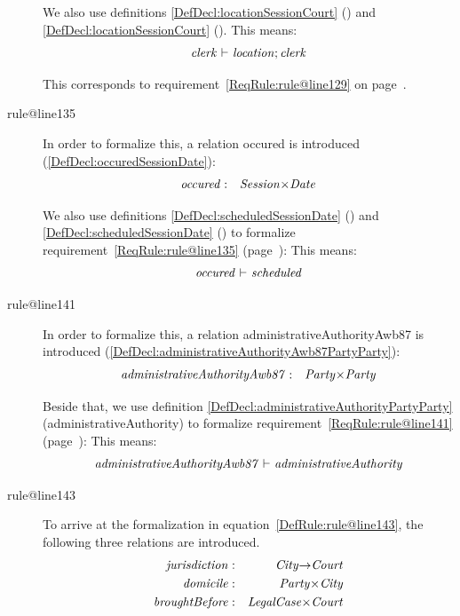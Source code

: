 \documentclass[10pt,a4paper]{report}              %
\theoremstyle{plain}\theorembodyfont{\rmfamily}\newtheorem{definition}{Definition}[section]
\theoremstyle{plain}\theorembodyfont{\rmfamily}\newtheorem{designrule}[definition]{Requirement}
\def\id#1{\mbox{\em #1\/}}
\begin{document}
\begin{description}
We also use definitions \ref{DefDecl:locationSessionCourt} ({}) and \ref{DefDecl:locationSessionCourt} ({}). 
This means: 
\begin{equation}
   {\id{clerk}}\ {\vdash}\ {\id{location}};{\id{clerk}}\label{DefRule:rule@line129}
\end{equation}

This corresponds to requirement~\ref{ReqRule:rule@line129} on page~\pageref{ReqRule:rule@line129}.
\item[rule@line135]
In order to formalize this, a relation
occured is introduced (\ref{DefDecl:occuredSessionDate}):
\begin{eqnarray}
   {\id{occured}}&:&{\id{Session}}{\times}{\id{Date}}\label{DefDecl:occuredSessionDate}
\end{eqnarray}

We also use definitions \ref{DefDecl:scheduledSessionDate} ({}) and \ref{DefDecl:scheduledSessionDate} ({}) to formalize requirement~\ref{ReqRule:rule@line135} (page~\pageref{ReqRule:rule@line135}):
This means: 
\begin{equation}
   {\id{occured}}\ {\vdash}\ {\id{scheduled}}\label{DefRule:rule@line135}
\end{equation}

\item[rule@line141]
In order to formalize this, a relation
administrativeAuthorityAwb87 is introduced (\ref{DefDecl:administrativeAuthorityAwb87PartyParty}):
\begin{eqnarray}
   {\id{administrativeAuthorityAwb87}}&:&{\id{Party}}{\times}{\id{Party}}\label{DefDecl:administrativeAuthorityAwb87PartyParty}
\end{eqnarray}

Beside that, we use definition \ref{DefDecl:administrativeAuthorityPartyParty}
(administrativeAuthority) to formalize requirement~\ref{ReqRule:rule@line141} (page~\pageref{ReqRule:rule@line141}):
This means: 
\begin{equation}
   {\id{administrativeAuthorityAwb87}}\ {\vdash}\ {\id{administrativeAuthority}}\label{DefRule:rule@line141}
\end{equation}

\item[rule@line143]
To arrive at the formalization in equation~\ref{DefRule:rule@line143}, the following three relations are introduced.
\begin{eqnarray}
   {\id{jurisdiction}}&:&{\id{City}}{\rightarrow}{\id{Court}}\label{DefDecl:jurisdictionCityCourt}\\
   {\id{domicile}}&:&{\id{Party}}{\times}{\id{City}}\label{DefDecl:domicilePartyCity}\\
   {\id{broughtBefore}}&:&{\id{LegalCase}}{\times}{\id{Court}}\label{DefDecl:broughtBeforeLegalCaseCourt}
\end{eqnarray}


\end{description}
\end{document}
